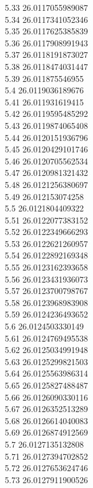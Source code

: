 {5.33	26.0117055989087\\
5.34	26.0117341052346\\
5.35	26.0117625385839\\
5.36	26.0117908991943\\
5.37	26.0118191873027\\
5.38	26.0118474031447\\
5.39	26.011875546955\\
5.4	26.0119036189676\\
5.41	26.011931619415\\
5.42	26.0119595485292\\
5.43	26.0119874065408\\
5.44	26.0120151936796\\
5.45	26.0120429101746\\
5.46	26.0120705562534\\
5.47	26.0120981321432\\
5.48	26.0121256380697\\
5.49	26.012153074258\\
5.5	26.0121804409322\\
5.51	26.0122077383152\\
5.52	26.0122349666293\\
5.53	26.0122621260957\\
5.54	26.0122892169348\\
5.55	26.0123162393658\\
5.56	26.0123431936073\\
5.57	26.0123700798767\\
5.58	26.0123968983908\\
5.59	26.0124236493652\\
5.6	26.0124503330149\\
5.61	26.0124769495538\\
5.62	26.0125034991948\\
5.63	26.0125299821503\\
5.64	26.0125563986314\\
5.65	26.0125827488487\\
5.66	26.0126090330116\\
5.67	26.0126352513289\\
5.68	26.0126614040083\\
5.69	26.0126874912569\\
5.7	26.0127135132808\\
5.71	26.0127394702852\\
5.72	26.0127653624746\\
5.73	26.0127911900526\\
}
